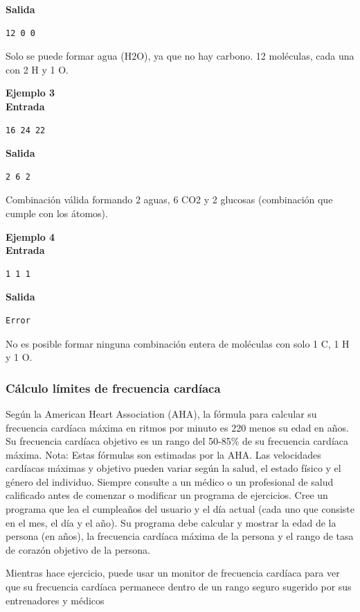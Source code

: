 \textbf{Salida}
\begin{verbatim}
12 0 0
\end{verbatim}
Solo se puede formar agua (H2O), ya que no hay carbono. 12 moléculas, cada una con 2 H y 1 O.


\textbf{Ejemplo 3}\\
\textbf{Entrada}
\begin{verbatim}
16 24 22
\end{verbatim}

\textbf{Salida}
\begin{verbatim}
2 6 2
\end{verbatim}
Combinación válida formando 2 aguas, 6 CO2 y 2 glucosas (combinación que cumple con los átomos).

\textbf{Ejemplo 4}\\
\textbf{Entrada}
\begin{verbatim}
1 1 1
\end{verbatim}

\textbf{Salida}
\begin{verbatim}
Error
\end{verbatim}
No es posible formar ninguna combinación entera de moléculas con solo 1 C, 1 H y 1 O.



\subsubsection{Cálculo límites de frecuencia cardíaca}

Según la American Heart Association (AHA), la fórmula para calcular su frecuencia cardíaca máxima en ritmos por minuto es 220 menos su edad en años.
Su frecuencia cardíaca objetivo es un rango del 50-85\% de su frecuencia cardíaca máxima.
Nota: Estas fórmulas son estimadas por la AHA.
Las velocidades cardíacas máximas y objetivo pueden variar según la salud, el estado físico y el género del individuo.
Siempre consulte a un médico o un profesional de salud calificado antes de comenzar o modificar un programa de ejercicios.
Cree un programa que lea el cumpleaños del usuario y el día actual (cada uno que consiste en el mes, el día y el año).
Su programa debe calcular y mostrar la edad de la persona (en años), la frecuencia cardíaca máxima de la persona y el rango de tasa de corazón objetivo de la persona.

Mientras hace ejercicio, puede usar un monitor de frecuencia cardíaca para ver que su frecuencia cardíaca permanece dentro de un rango seguro sugerido por sus entrenadores y médicos

